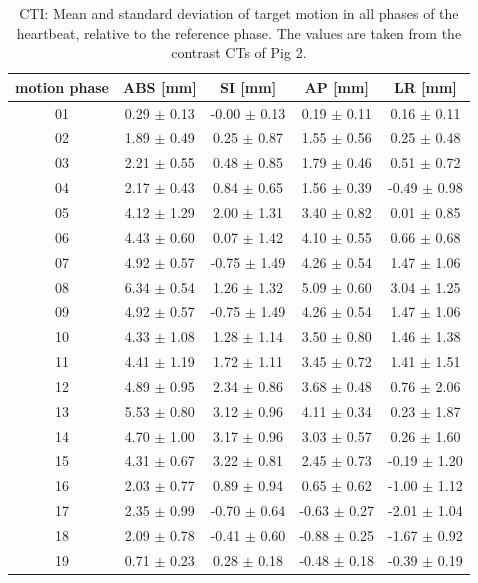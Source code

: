 \documentclass[type=dr, dr=rernat, accentcolor=tud7b,colorbacktitle, bigchapter, openright, twoside, 12pt ]{tudthesis}
\begin{document}
\newpage

\begin{table}[H]
  \centering
  \scriptsize
  \caption{CTI: Mean and standard deviation of target motion in all phases of the heartbeat, relative to the reference phase. The values are 
  taken from the contrast CTs of Pig 2.}
  \begin{tabular}{|c|c|c|c|c|}
    \hline\hline
    motion phase\rule{0pt}{2.6ex}\rule[-1.2ex]{0pt}{0pt} & ABS [mm] & SI [mm] & AP [mm] & LR [mm]\\
    \hline
01 &0.29 $\pm$ 0.13 &-0.00 $\pm$ 0.13 &0.19 $\pm$ 0.11 &0.16 $\pm$ 0.11 \\
02 &1.89 $\pm$ 0.49 &0.25 $\pm$ 0.87 &1.55 $\pm$ 0.56 &0.25 $\pm$ 0.48 \\
03 &2.21 $\pm$ 0.55 &0.48 $\pm$ 0.85 &1.79 $\pm$ 0.46 &0.51 $\pm$ 0.72 \\
04 &2.17 $\pm$ 0.43 &0.84 $\pm$ 0.65 &1.56 $\pm$ 0.39 &-0.49 $\pm$ 0.98 \\
05 &4.12 $\pm$ 1.29 &2.00 $\pm$ 1.31 &3.40 $\pm$ 0.82 &0.01 $\pm$ 0.85 \\
06 &4.43 $\pm$ 0.60 &0.07 $\pm$ 1.42 &4.10 $\pm$ 0.55 &0.66 $\pm$ 0.68 \\
07 &4.92 $\pm$ 0.57 &-0.75 $\pm$ 1.49 &4.26 $\pm$ 0.54 &1.47 $\pm$ 1.06 \\
08 &6.34 $\pm$ 0.54 &1.26 $\pm$ 1.32 &5.09 $\pm$ 0.60 &3.04 $\pm$ 1.25 \\
09 &4.92 $\pm$ 0.57 &-0.75 $\pm$ 1.49 &4.26 $\pm$ 0.54 &1.47 $\pm$ 1.06 \\
10 &4.33 $\pm$ 1.08 &1.28 $\pm$ 1.14 &3.50 $\pm$ 0.80 &1.46 $\pm$ 1.38 \\
11 &4.41 $\pm$ 1.19 &1.72 $\pm$ 1.11 &3.45 $\pm$ 0.72 &1.41 $\pm$ 1.51 \\
12 &4.89 $\pm$ 0.95 &2.34 $\pm$ 0.86 &3.68 $\pm$ 0.48 &0.76 $\pm$ 2.06 \\
13 &5.53 $\pm$ 0.80 &3.12 $\pm$ 0.96 &4.11 $\pm$ 0.34 &0.23 $\pm$ 1.87 \\
14 &4.70 $\pm$ 1.00 &3.17 $\pm$ 0.96 &3.03 $\pm$ 0.57 &0.26 $\pm$ 1.60 \\
15 &4.31 $\pm$ 0.67 &3.22 $\pm$ 0.81 &2.45 $\pm$ 0.73 &-0.19 $\pm$ 1.20 \\
16 &2.03 $\pm$ 0.77 &0.89 $\pm$ 0.94 &0.65 $\pm$ 0.62 &-1.00 $\pm$ 1.12 \\
17 &2.35 $\pm$ 0.99 &-0.70 $\pm$ 0.64 &-0.63 $\pm$ 0.27 &-2.01 $\pm$ 1.04 \\
18 &2.09 $\pm$ 0.78 &-0.41 $\pm$ 0.60 &-0.88 $\pm$ 0.25 &-1.67 $\pm$ 0.92 \\
19 &0.71 $\pm$ 0.23 &0.28 $\pm$ 0.18 &-0.48 $\pm$ 0.18 &-0.39 $\pm$ 0.19 \\
    \hline\hline
  \end{tabular}
  \label{tab:motion:CTI:Pig2}
\end{table}
\end{document}
